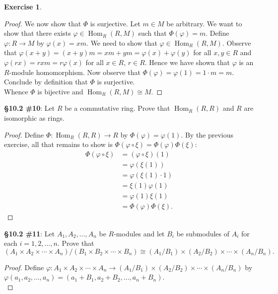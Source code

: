 \documentclass[8pt]{amsart}
\theoremstyle{plain}%
\theoremstyle{definition}
\newtheorem*{exercise}{Exercise}%
\theoremstyle{remark}
\numberwithin{equation}{section}
\begin{document}
\begin{exercise}
\begin{proof}
		We now show that $\Phi$ is surjective. Let $m \in M$ be arbitrary. We want to show that there exists $\varphi \in \operatorname{Hom}_R(R, M)$ such that $\Phi(\varphi) = m$. Define $\varphi : R \to M$ by $\varphi(x) = xm$. We need to show that $\varphi \in \operatorname{Hom}_R(R, M)$. Observe that $\varphi(x + y) = (x + y)m = xm + ym = \varphi(x) + \varphi(y)$ for all $x, y \in R$ and $\varphi(rx) = rxm = r \varphi(x)$ for all $x \in R$, $r \in R$. Hence we have shown that $\varphi$ is an $R$-module homomorphism. Now observe that $\Phi(\varphi) = \varphi(1) = 1 \cdot m = m$. Conclude by definition that $\Phi$ is surjective.\\

	Whence $\Phi$ is bijective and $\operatorname{Hom}_R(R, M) \cong M$.	
	\end{proof}


\textbf{\S 10.2 \#10}: Let $R$ be a commutative ring. Prove that $\operatorname{Hom}_R(R, R)$ and $R$ are isomorphic as rings.
	\begin{proof}
		Define $\Phi : \operatorname{Hom}_R(R, R) \to R$ by $\Phi(\varphi) = \varphi(1)$. By the previous exercise, all that remains to show is $\Phi(\varphi \circ \xi) = \Phi(\varphi) \Phi(\xi)$:
		\begin{align*}
			\Phi(\varphi \circ \xi) &= (\varphi \circ \xi)(1)\\
			&= \varphi(\xi(1))\\
			&= \varphi(\xi(1) \cdot 1)\\
			&= \xi(1) \varphi(1)\\
			&= \varphi(1) \xi(1)\\
			&= \Phi(\varphi) \Phi(\xi).
		\end{align*}
	\end{proof}


\textbf{\S 10.2 \#11}: Let $A_1, A_2, \ldots, A_n$ be $R$-modules and let $B_i$ be submodules of $A_i$ for each $i = 1, 2, \ldots, n$. Prove that $$(A_1 \times A_2 \times \cdots \times A_n)/(B_1 \times B_2 \times \cdots \times B_n) \cong (A_1/B_1) \times (A_2/B_2) \times \cdots \times (A_n/B_n).$$
	\begin{proof}
		Define $\varphi : A_1 \times A_2 \times \cdots \times A_n \to (A_1/B_1) \times (A_2/B_2) \times \cdots \times (A_n/B_n)$ by $\varphi(a_1, a_2, \ldots, a_n) = (a_1 + B_1, a_2 + B_2, \ldots, a_n + B_n)$. \\
		

\end{proof}
\end{exercise}
\end{document}
